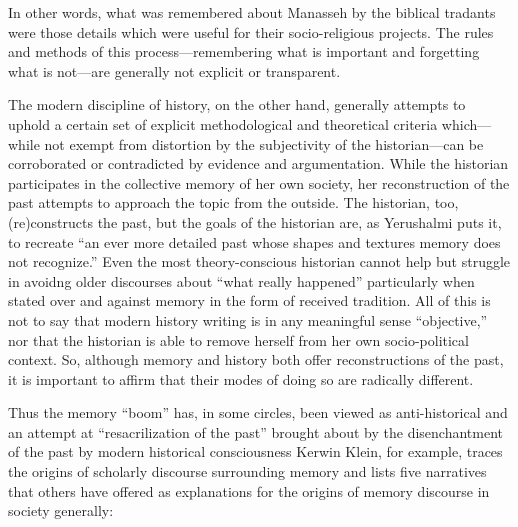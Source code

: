 In other words, what was remembered about Manasseh by the biblical
tradants were those details which were useful for their socio-religious
projects. The rules and methods of this process---remembering what is
important and forgetting what is not---are generally not explicit or
transparent.

The modern discipline of history, on the other hand, generally attempts
to uphold a certain set of explicit methodological and theoretical
criteria which---while not exempt from distortion by the subjectivity of
the historian---can be corroborated or contradicted by evidence and
argumentation.\autocite[As Daniel Pioske puts it, ``What separates the
act of historiography from the recounting of a culture's sanctioned
memories is consequently the historians' determination to isolate and
compare disparate testimonies about the past with other past traces that
ma corroborate or discredit their
claims.''][302--303]{pioske_bibint2015} While the historian participates
in the collective memory of her own society, her reconstruction of the
past attempts to approach the topic from the outside. The historian,
too, (re)constructs the past, but the goals of the historian are, as
Yerushalmi puts it, to recreate ``an ever more detailed past whose
shapes and textures memory does not
recognize.''\autocites[94]{yerushalmi1989}[See
also][532]{verovsek_pgi2016} Even the most theory-conscious historian
cannot help but struggle in avoidng older discourses about ``what really
happened'' particularly when stated over and against memory in the form
of received tradition. All of this is not to say that modern history
writing is in any meaningful sense ``objective,'' nor that the historian
is able to remove herself from her own socio-political context. So,
although memory and history both offer reconstructions of the past, it
is important to affirm that their modes of doing so are radically
different.\autocite[Pioske observes, ``The epistemological tension
observed by Ricoeur between memory and history is thus understood as the
outcome of two processes that, though having the similar intent of
re-presenting former phenomena, nevertheless pursue and mediate the past
through quite disparate means.''][302]{pioske_bibint2015}

Thus the memory ``boom'' has, in some circles, been viewed as
anti-historical and an attempt at ``resacrilization of the past''
brought about by the disenchantment of the past by modern historical
consciousness\autocite[282]{winter2006} Kerwin Klein, for example,
traces the origins of scholarly discourse surrounding memory and lists
five narratives that others have offered as explanations for the origins
of memory discourse in society generally:


